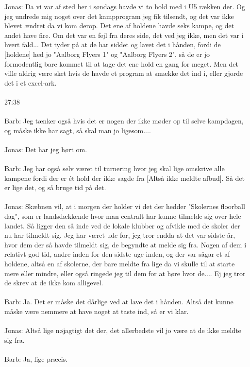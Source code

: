 Jonas: Da vi var af sted her i søndags havde vi to hold med i U5 rækken der. Og jeg undrede mig noget over det kampprogram jeg fik tilsendt, og det var ikke blevet ændret da vi kom derop. Det ene af holdene havde seks kampe, og det andet have fire. Om det var en fejl fra deres side, det ved jeg ikke, men det var i hvert fald... Det tyder på at de har siddet og lavet det i hånden, fordi de [holdene] hed jo "Aalborg Flyers 1" og "Aalborg Flyers 2", så de er jo formodentlig bare kommet til at tage det ene hold en gang for meget. Men det ville aldrig være sket hvis de havde et program at smække det ind i, eller gjorde det i et excel-ark.
\\\\
27:38
\\\\
Barb: Jeg tænker også hvis det er nogen der ikke møder op til selve kampdagen, og måske ikke har sagt, så skal man jo ligesom....
\\\\
Jonas: Det har jeg hørt om.
\\\\
Barb: Jeg har også selv været til turnering hvor jeg skal lige omskrive alle kampene fordi der er ét hold der ikke sagde fra [Altså ikke meldte afbud]. Så det er lige det, og så bruge tid på det.
\\\\
Jonas: Skæbnen vil, at i morgen der holder vi det der hedder "Skolernes floorball dag", som er landsdækkende hvor man centralt har kunne tilmelde sig over hele landet. Så ligger den så inde ved de lokale klubber og afvikle med de skoler der nu har tilmeldt sig. Jeg har været ude for, jeg tror endda at det var sidste år, hvor dem der så havde tilmeldt sig, de begyndte at melde sig fra. Nogen af dem i relativt god tid, andre inden for den sidste uge inden, og der var sågar et af holdene, altså en af skolerne, der bare meldte fra lige da vi skulle til at starte mere eller mindre, eller også ringede jeg til dem for at høre hvor de.... Ej jeg tror de skrev at de ikke kom alligevel.
\\\\
Barb: Ja. Det er måske det dårlige ved at lave det i hånden. Altså det kunne måske være nemmere at have noget at taste ind, så er vi klar.
\\\\
Jonas: Altså lige nøjagtigt det der, det allerbedste vil jo være at de ikke meldte sig fra.
\\\\
Barb: Ja, lige præcis.
